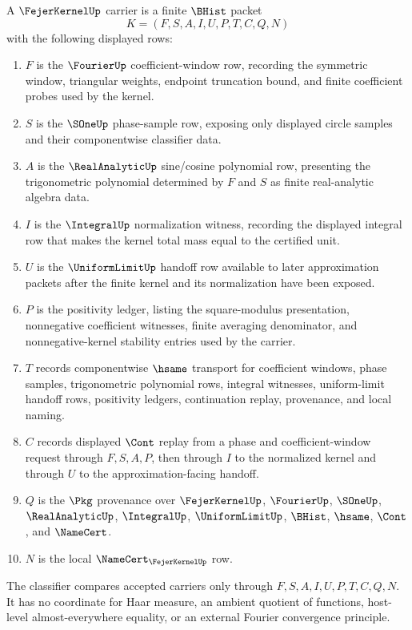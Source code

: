 \begin{definition}\label{def:fejer-kernel-carrier}
A $\FejerKernelUp$ carrier is a finite $\BHist$ packet
$$
K=(F,S,A,I,U,P,T,C,Q,N)
$$
with the following displayed rows:
\begin{enumerate}
\item $F$ is the $\FourierUp$ coefficient-window row, recording the symmetric window, triangular weights, endpoint truncation bound, and finite coefficient probes used by the kernel.
\item $S$ is the $\SOneUp$ phase-sample row, exposing only displayed circle samples and their componentwise classifier data.
\item $A$ is the $\RealAnalyticUp$ sine/cosine polynomial row, presenting the trigonometric polynomial determined by $F$ and $S$ as finite real-analytic algebra data.
\item $I$ is the $\IntegralUp$ normalization witness, recording the displayed integral row that makes the kernel total mass equal to the certified unit.
\item $U$ is the $\UniformLimitUp$ handoff row available to later approximation packets after the finite kernel and its normalization have been exposed.
\item $P$ is the positivity ledger, listing the square-modulus presentation, nonnegative coefficient witnesses, finite averaging denominator, and nonnegative-kernel stability entries used by the carrier.
\item $T$ records componentwise $\hsame$ transport for coefficient windows, phase samples, trigonometric polynomial rows, integral witnesses, uniform-limit handoff rows, positivity ledgers, continuation replay, provenance, and local naming.
\item $C$ records displayed $\Cont$ replay from a phase and coefficient-window request through $F,S,A,P$, then through $I$ to the normalized kernel and through $U$ to the approximation-facing handoff.
\item $Q$ is the $\Pkg$ provenance over $\FejerKernelUp$, $\FourierUp$, $\SOneUp$, $\RealAnalyticUp$, $\IntegralUp$, $\UniformLimitUp$, $\BHist$, $\hsame$, $\Cont$, and $\NameCert$.
\item $N$ is the local $\NameCert_{\FejerKernelUp}$ row.
\end{enumerate}
The classifier compares accepted carriers only through $F,S,A,I,U,P,T,C,Q,N$. It has no coordinate for Haar measure, an ambient quotient of functions, host-level almost-everywhere equality, or an external Fourier convergence principle.
\end{definition}


